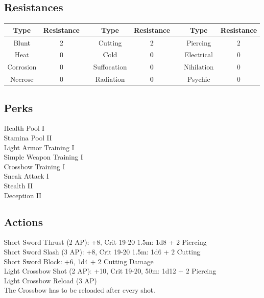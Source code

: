 \subsection{Resistances}
\begin{minipage}[H]{1\textwidth}
	\centering
	\begin{tabular}[c]{|c | c | c | c | c | c | c | c|}
		\hline
		Type & Resistance && Type & Resistance && Type & Resistance\\
		\hline
		Blunt & 2 &&
		Cutting & 2 &&
		Piercing & 2\\
		Heat & 0 &&
		Cold & 0 &&
		Electrical & 0\\
		Corrosion & 0 &&
		Suffocation & 0 &&
		Nihilation & 0 \\
		Necrose & 0 &&
		Radiation & 0 &&
		Psychic & 0\\
		\hline
	\end{tabular}
\end{minipage}

\subsection{Perks}
Health Pool I\\
Stamina Pool II\\
Light Armor Training I\\
Simple Weapon Training I\\
Crossbow Training I\\
Sneak Attack I\\
Stealth II\\
Deception II\\

\subsection{Actions}
Short Sword Thrust (2 AP): +8, Crit 19-20 1.5m: 1d8 + 2 Piercing\\

Short Sword Slash (3 AP): +8, Crit 19-20 1.5m: 1d6 + 2 Cutting\\

Short Sword Block: +6, 1d4 + 2 Cutting Damage\\

Light Crossbow Shot (2 AP): +10, Crit 19-20, 50m: 1d12 + 2 Piercing\\

Light Crossbow Reload (3 AP)\\
The Crossbow has to be reloaded after every shot.

